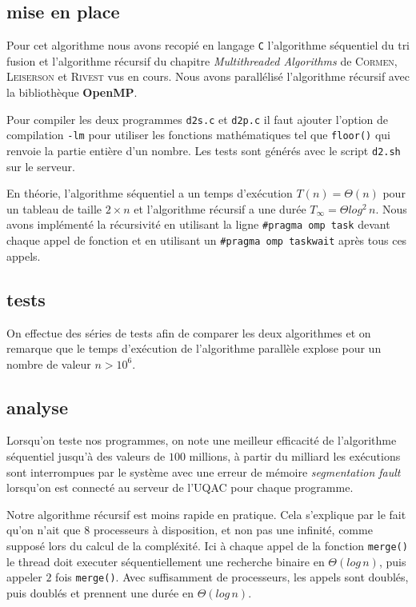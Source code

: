 \subsection*{mise en place}
Pour cet algorithme nous avons recopié en langage \verb+C+ l'algorithme séquentiel du tri fusion et l'algorithme récursif du chapitre \textit{Multithreaded Algorithms} de \textsc{Cormen}, \textsc{Leiserson} et \textsc{Rivest} vus en cours. Nous avons parallélisé l'algorithme récursif avec la bibliothèque \textbf{OpenMP}.

Pour compiler les deux programmes \verb+d2s.c+ et \verb+d2p.c+ il faut ajouter l'option de compilation \verb+-lm+ pour utiliser les fonctions mathématiques tel que \verb+floor()+ qui renvoie la partie entière d'un nombre. Les tests sont générés avec le script \verb+d2.sh+ sur le serveur.

En théorie, l'algorithme séquentiel a un temps d'exécution $T(n) = \Theta(n)$ pour un tableau de taille $2 \times n$ et l'algorithme récursif a une durée $T_\infty = \Theta log^2 \, n$. Nous avons implémenté la récursivité en utilisant la ligne \verb+#pragma omp task+ devant chaque appel de fonction et en utilisant un \verb+#pragma omp taskwait+ après tous ces appels.

\subsection*{tests}
On effectue des séries de tests afin de comparer les deux algorithmes et on remarque que le temps d'exécution de l'algorithme parallèle explose pour un nombre de valeur $n > 10^6$.


\newpage
\subsection*{analyse}
Lorsqu'on teste nos programmes, on note une meilleur efficacité de l'algorithme séquentiel jusqu'à des valeurs de $100$ millions, à partir du milliard les exécutions sont interrompues par le système avec une erreur de mémoire \emph{segmentation fault} lorsqu'on est connecté au serveur de l'UQAC pour chaque programme.

Notre algorithme récursif est moins rapide en pratique. Cela s'explique par le fait qu'on n'ait que 8 processeurs à disposition, et non pas une infinité, comme supposé lors du calcul de la compléxité. Ici à chaque appel de la fonction \verb+merge()+ le thread doit executer séquentiellement une recherche binaire en $ \Theta (log \, n)$, puis appeler $2$ fois \verb+merge()+. Avec suffisamment de processeurs, les appels sont doublés, puis doublés et prennent une durée en $\Theta (log \, n)$.

